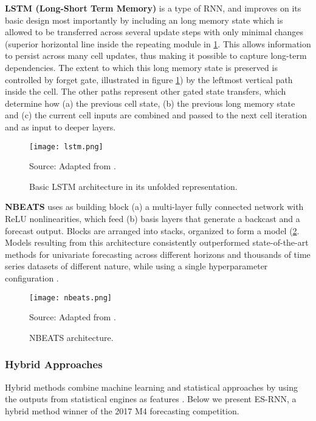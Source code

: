 \noindent
\textbf{LSTM (Long-Short Term Memory)} is a type of RNN, and improves on its basic design most importantly by including an long memory state which is allowed to be transferred across several update steps with only minimal changes (superior horizontal line inside the repeating module in \ref{fig:lstm}. This allows information to persist across many cell updates, thus making it possible to capture long-term dependencies. The extent to which this long memory state is preserved is controlled by forget gate, illustrated in figure \ref{fig:lstm}) by the leftmost vertical path inside the cell. The other paths represent other gated state transfers, which determine how (a) the previous cell state, (b) the previous long memory state and (c) the current cell inputs are combined and passed to the next cell iteration and as input to deeper layers.
\begin{figure}[H]
	\centering
    \caption{Basic LSTM architecture in its unfolded representation. }
    \texttt{[image: lstm.png]}  \\
    \raggedright
    Source: Adapted from \cite{paneru2015lstm}.
	\label{fig:lstm}
\end{figure}

\noindent
\textbf{NBEATS} uses as building block (a) a multi-layer fully connected network with ReLU nonlinearities, which feed (b) basis layers that generate a backcast and a forecast output. Blocks are arranged into stacks, organized to form a model (\ref{fig:nbeats}.  Models resulting from this architecture consistently outperformed state-of-the-art methods for univariate forecasting across different horizons and thousands of time series datasets of different nature, while using a single hyperparameter configuration \cite{oreshkin2019nbeats}.
\begin{figure}[H]
	\centering
    \caption{NBEATS architecture.}
    \texttt{[image: nbeats.png]}  \\
    \raggedright
    Source: Adapted from \cite{oreshkin2019nbeats}.
	\label{fig:nbeats}
\end{figure}

\subsubsection{Hybrid Approaches}
Hybrid methods combine machine learning and statistical approaches by using the outputs from statistical engines as features \cite{oreshkin2019nbeats}. Below we present ES-RNN, a hybrid method winner of the 2017 M4 forecasting competition.

